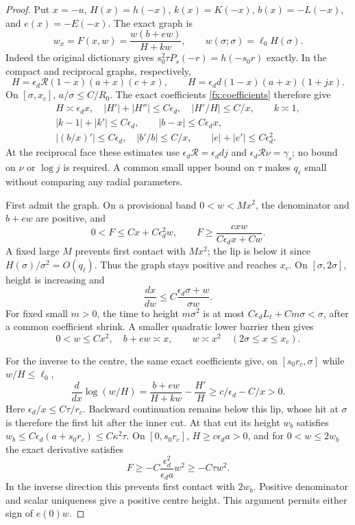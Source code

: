 \begin{proof}
Put \(x=-u\), \(H(x)=h(-x)\), \(k(x)=K(-x)\),
\(b(x)=-L(-x)\), and \(e(x)=-E(-x)\). The exact graph is
\begin{equation}\label{deg:landing-direct-graph}
 w_x=F(x,w)=\frac{w(b+ew)}{H+kw},\qquad
 w(\sigma;\sigma)=\ell_0H(\sigma).
\end{equation}
Indeed the original dictionary gives
\(s_0^2\tau P_s(-r)=h(-s_0r)\) exactly.
In the compact and reciprocal graphs, respectively,
\[
 H=\epsilon_d\mathcal R(1-x)(a+x)(c+x),\qquad
 H=\epsilon_dd(1-x)(a+x)(1+jx).
\]
On \([\sigma,x_c]\), \(a/\sigma\le C/R_0\).
The exact coefficients \eqref{fx:coefficients} therefore give
\begin{equation}\label{deg:landing-direct-coefficients}
 \begin{gathered}
 H\asymp\epsilon_dx,\quad |H'|+|H''|\le C\epsilon_d,\quad
 |H'/H|\le C/x,\qquad k\asymp1,\\
 |k-1|+|k'|\le C\epsilon_d,\qquad |b-x|\le C\epsilon_dx,\\
 |(b/x)'|\le C\epsilon_d,\quad
 |b'/b|\le C/x,\qquad |e|+|e'|\le C\epsilon_d^2 .
 \end{gathered}
\end{equation}
At the reciprocal face these estimates use
\(\epsilon_d\mathcal R=\epsilon_ddj\) and
\(\epsilon_d\mathcal R\nu=\gamma_s\); no bound on \(\nu\) or
\(\log j\) is required. A common small upper bound on \(\tau\)
makes \(q_\ell\) small without comparing any radial parameters.

First admit the graph. On a provisional band \(0<w<Mx^2\),
the denominator and \(b+ew\) are positive, and
\[
 0<F\le Cx+C\epsilon_d^2w,\qquad
 F\ge\frac{cxw}{C\epsilon_dx+Cw}.
\]
A fixed large \(M\) prevents first contact with \(Mx^2\);
the lip is below it since \(H(\sigma)/\sigma^2=O(q_\ell)\).
Thus the graph stays positive and reaches \(x_c\).
On \([\sigma,2\sigma]\), height is increasing and
\[
 \frac{dx}{dw}\le C\frac{\epsilon_d\sigma+w}{\sigma w}.
\]
For fixed small \(m>0\), the time to height \(m\sigma^2\) is at
most \(C\epsilon_dL_\ell+Cm\sigma<\sigma\), after a common
coefficient shrink. A smaller quadratic lower barrier then gives
\begin{equation}\label{deg:landing-direct-corridor}
 0<w\le Cx^2,\quad b+ew\asymp x,\qquad
 w\asymp x^2\quad(2\sigma\le x\le x_c).
\end{equation}

For the inverse to the centre, the same exact coefficients give,
on \([s_0r_c,\sigma]\) while \(w/H\le\ell_0\),
\[
 \frac{d}{dx}\log(w/H)
 =\frac{b+ew}{H+kw}-\frac{H'}H
 \ge c/\epsilon_d-C/x>0.
\]
Here \(\epsilon_d/x\le C\tau/r_c\). Backward continuation remains
below this lip, whose hit at \(\sigma\) is therefore the first hit
after the inner cut. At that cut its height \(w_b\) satisfies
\(w_b\le C\epsilon_d(a+s_0r_c)\le C\kappa^2\tau\).
On \([0,s_0r_c]\), \(H\ge c\epsilon_da>0\), and for
\(0<w\le2w_b\) the exact derivative satisfies
\[
 F\ge-C\frac{\epsilon_d^2}{\epsilon_da}w^2\ge-C\tau w^2.
\]
In the inverse direction this prevents first contact with \(2w_b\).
Positive denominator and scalar uniqueness give a positive centre
height. This argument permits either sign of \(e(0)w\).


\end{proof}
